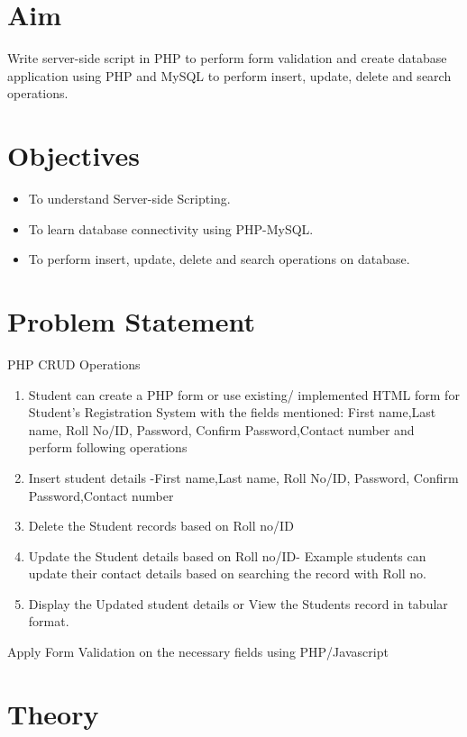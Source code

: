 \documentclass[11pt]{article}
\begin{document}
\tableofcontents
\thispagestyle{empty}
\clearpage

\setcounter{page}{1}

\section{Aim}
Write server-side script in PHP to perform form validation and create database application
using PHP and MySQL to perform insert, update, delete and search operations.

\section{Objectives}
\begin{itemize}
    \item To understand Server-side Scripting.
    \item To learn database connectivity using PHP-MySQL.
    \item To perform insert, update, delete and search operations on database.
\end{itemize}

\section{Problem Statement}
PHP CRUD Operations\\
\begin{enumerate}
    \item Student can create a PHP form or use existing/ implemented HTML form for Student’s
          Registration System with the fields mentioned: First name,Last name, Roll No/ID, Password,
          Confirm Password,Contact number and perform following operations
    \item Insert student details -First name,Last name, Roll No/ID, Password, Confirm Password,Contact
          number
    \item Delete the Student records based on Roll no/ID
    \item Update the Student details based on Roll no/ID- Example students can update their contact
          details based on searching the record with Roll no.
    \item Display the Updated student details or View the Students record in tabular format.
\end{enumerate}
Apply Form Validation on the necessary fields using PHP/Javascript

\section{Theory}
\end{document}
